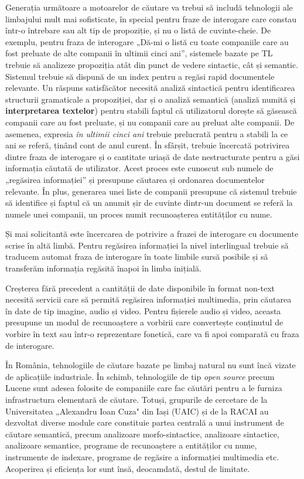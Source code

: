 \begin{multicols}{2}
Generația următoare a motoarelor de căutare va trebui să includă tehnologii ale limbajului mult mai sofisticate, în special pentru fraze de interogare care constau \mbox{într-o} întrebare sau alt tip de propoziție, și nu o listă de cuvinte-cheie. De exemplu, pentru fraza de interogare „Dă-mi o listă cu toate companiile care au fost preluate de alte companii în ultimii cinci ani”, sistemele bazate pe TL trebuie să analizeze propoziția atât din punct de vedere sintactic, cât și semantic. Sistemul trebuie să dispună de un index pentru a regăsi rapid documentele relevante. Un răspuns satisfăcător necesită analiză sintactică pentru identificarea structurii gramaticale a propoziției, dar și o analiză semantică (analiză numită și \textbf{interpretarea textelor}) pentru stabili faptul că utilizatorul dorește să găsească companii care au fost preluate, și nu companii care au preluat alte companii. De asemenea, expresia \textit{în ultimii cinci ani} trebuie prelucrată pentru a stabili la ce ani se referă, ținând cont de anul curent. În sfârșit, trebuie încercată potrivirea dintre fraza de interogare și o cantitate uriașă de date nestructurate pentru a găsi informația căutată de utilizator. Acest proces este cunoscut sub numele de „regăsirea informației” și presupune căutarea și ordonarea documentelor relevante. În plus, generarea unei liste de companii presupune că sistemul trebuie să identifice și faptul că un anumit șir de cuvinte \mbox{dintr-un} document se referă la numele unei companii, un proces numit recunoașterea entităților cu nume.

Și mai solicitantă este încercarea de potrivire a frazei de interogare cu documente scrise în altă limbă. Pentru regăsirea informației la nivel interlingual trebuie să traducem automat fraza de interogare în toate limbile sursă posibile și să transferăm informația regăsită înapoi în limba inițială. 

Creșterea fără precedent a cantității de date disponibile în format non-text necesită servicii care să permită regăsirea informației multimedia, prin căutarea în date de tip imagine, audio și video. Pentru fișierele audio și video, aceasta presupune un modul de recunoaștere a vorbirii care convertește conținutul de vorbire în text sau \mbox{într-o} reprezentare fonetică, care va fi apoi comparată cu fraza de interogare.

În România, tehnologiile de căutare bazate pe limbaj natural nu sunt încă vizate de aplicațiile industriale. În schimb, tehnologiile de tip \textit{open source} precum Lucene sunt adesea folosite de companiile care fac căutări pentru a le furniza infrastructura elementară de căutare. Totuși, grupurile de cercetare de la Universitatea „Alexandru Ioan Cuza" din Iași (UAIC) și de la RACAI au dezvoltat diverse module care constituie partea centrală a unui instrument de căutare semantică, precum analizoare morfo-sintactice, analizoare sintactice, analizoare semantice, programe de recunoaștere a entităților cu nume, instrumente de indexare, programe de regăsire a informației multimedia etc. Acoperirea și eficiența lor sunt însă, deocamdată,  destul de limitate.


\end{multicols}
